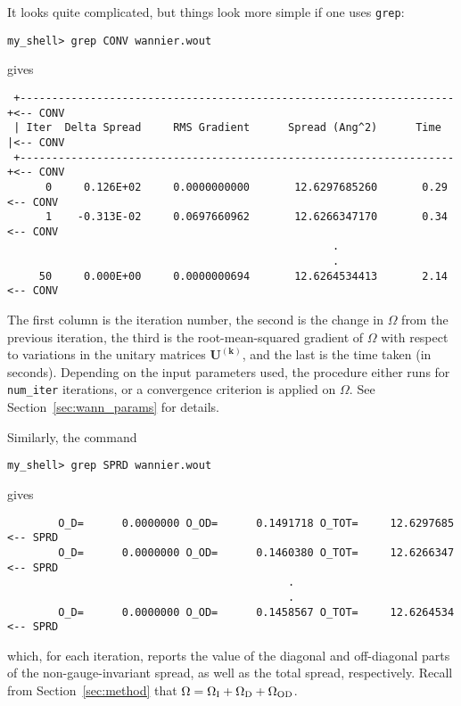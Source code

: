 It looks quite complicated, but things look more simple if one uses
{\tt grep}:

{\tt my\_shell> grep CONV wannier.wout}

gives

\begin{verbatim}
 +--------------------------------------------------------------------+<-- CONV
 | Iter  Delta Spread     RMS Gradient      Spread (Ang^2)      Time  |<-- CONV
 +--------------------------------------------------------------------+<-- CONV
      0     0.126E+02     0.0000000000       12.6297685260       0.29  <-- CONV
      1    -0.313E-02     0.0697660962       12.6266347170       0.34  <-- CONV
                                                   .
                                                   .
     50     0.000E+00     0.0000000694       12.6264534413       2.14  <-- CONV
\end{verbatim}

The first column is the iteration number, the second is the change in
$\Omega$ from the previous iteration, the third is the root-mean-squared
gradient of $\Omega$ with respect to variations in the unitary
matrices $\mathbf{U}^{(\mathbf{k})}$, and the last is the time taken (in
seconds). Depending on the input parameters used, the procedure either
runs for {\tt num\_iter} iterations, or a convergence criterion is
applied on $\Omega$. See Section~\ref{sec:wann_params} for details.

Similarly, the command

{\tt my\_shell> grep SPRD wannier.wout}

gives

\begin{verbatim}
        O_D=      0.0000000 O_OD=      0.1491718 O_TOT=     12.6297685 <-- SPRD
        O_D=      0.0000000 O_OD=      0.1460380 O_TOT=     12.6266347 <-- SPRD
                                            .
                                            .
        O_D=      0.0000000 O_OD=      0.1458567 O_TOT=     12.6264534 <-- SPRD         
\end{verbatim}

which, for each iteration, reports the value of the diagonal and
off-diagonal parts of the non-gauge-invariant spread, as well as the
total spread, respectively. Recall from Section~\ref{sec:method} that
$\Omega = \Omega_{\mathrm{I}} + \Omega_{\mathrm{D}} + \Omega_{\mathrm{OD}}$. 

